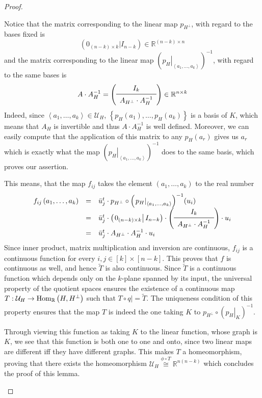 \begin{proof}
\begin{b_item}
Notice that the matrix corresponding to the linear map $p_{H^{\perp}}$, with regard to the bases fixed is
\[\left(0_{(n-k)\times k}|I_{n-k}\right)\in\mathbb{R}^{(n-k)\times n}\]
and the matrix corresponding to the linear map ${\left(\left.p_H\right|_{\left<a_1,\ldots,a_k\right>}\right)}^{-1}$, with regard to the same bases is
\[A\cdot A_H^{-1}=\left(\begin{array}{c}
I_k\\
\midrule
A_{H^{\perp}}\cdot A_H^{-1}\\
\end{array}\right)
\in\mathbb{R}^{n\times{k}}\]
Indeed, since $\left<a_1,\ldots,a_k\right>\in\mathcal{U}_H$, $\left\{p_H(a_1),\ldots,p_H(a_k)\right\}$ is a basis of $K$, which means that $A_H$ is invertible and thus $A\cdot A_H^{-1}$ is well defined. Moreover, we can easily compute that the application of this matrix to any $p_H(a_r)$ gives us $a_r$ which is exactly what the map ${\left({\left.p_H\right|}_{\left<a_1,\ldots,a_k\right>}\right)}^{-1}$ does to the same basis, which proves our assertion.

This means, that the map $f_{ij}$ takes the element $\left(a_1,\ldots,a_k\right)$ to the real number
\[\begin{array}{rcl}f_{ij}\left(a_1,\ldots,a_k\right)
&=&\bar{u}_j^t\cdot p_{H^{\perp}}\circ{\left(\left.p_H\right|_{\left<a_1,\ldots,a_k\right>}\right)}^{-1}(u_i)\\
&=&\bar{u}_j^t\cdot\left(\left.0_{(n-k)\times k}\right|I_{n-k}\right)\cdot\left(\begin{array}{c}I_k\\\midrule A_{H^{\perp}}\cdot A_H^{-1}\\\end{array}\right)\cdot u_i\\
&=&\bar{u}_j^t\cdot A_{H^{\perp}}\cdot A_H^{-1}\cdot u_i\\
\end{array}\]
Since inner product, matrix multiplication and inversion are continuous, $f_{ij}$ is a continuous function for every $i,j\in[k]\times[n-k]$. This proves that $f$ is continuous as well, and hence $\tilde T$ is also continuous. Since $\tilde T$ is a continuous function which depends only on the $k$-plane spanned by its input, the universal property of the quotient spaces ensures the existence of a continuous map $T:\mathcal{U}_H\to\mathrm{Hom}_{\mathbb{R}}\left(H,H^{\perp}\right)$ such that $T\circ \left.q\right|=\tilde T$. The uniqueness condition of this property ensures that the map $T$ is indeed the one taking $K$ to $p_{H^{\perp}}\circ{\left(\left.p_H\right|_K\right)}^{-1}$.

Through viewing this function as taking $K$ to the linear function, whose graph is $K$, we see that this function is both one to one and onto, since two linear maps are different iff they have different graphs. This makes $T$ a homeomorphism, proving that there exists the homeomorphism
$\mathcal{U}_H\overset{\phi\circ T}{\cong}\mathbb{R}^{n(n-k)}$
which concludes the proof of this lemma.\qedhere
\end{b_item}
\end{proof}
